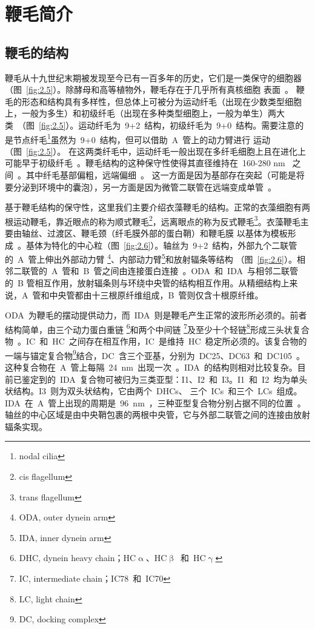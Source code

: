 \section{鞭毛简介}
\subsection{鞭毛的结构}
鞭毛从十九世纪末期被发现至今已有一百多年的历史，它们是一类保守的细胞器（图\ \ref{fig:2.5}）。除酵母和高等植物外，鞭毛存在于几乎所有真核细胞
表面\ \citep{Czarnecki2012,Wheatley1996,Brooks2014,Fliegauf2007}。 鞭毛的形态和结构具有多样性，但总体上可被分为运动纤毛（出现在少数类型细胞上，一般为多生）和初级纤毛（出现在多种类型细胞上，一般为单生）两大类\ \citep{Gluenz2010,Gibbons1960}（图\ \ref{fig:2.5}）。运动纤毛为\ 9+2\ 结构，初级纤毛为\ 9+0\ 结构。需要注意的是节点纤毛\footnote{nodal cilia}虽然为\ 9+0\ 结构，但可以借助\ A\ 管上的动力臂进行
运动\ \citep{Czarnecki2012} （图\ \ref{fig:2.5}）。 在这两类纤毛中，运动纤毛一般出现在多纤毛细胞上且在进化上可能早于初级纤毛\ \citep{Warner2013}。鞭毛结构的这种保守性使得其直径维持在\ 160-280 nm \ 之间\
\citep{Huang2016}。其中纤毛基部偏粗，远端偏细\ \citep{Huang2016}。 这一方面是因为基部存在突起（可能是将要分泌到环境中的囊泡），另一方面是因为微管二联管在远端变成单管\
\citep{Huang2016,Wang2014,Wood2013}。

基于鞭毛结构的保守性，这里我们主要介绍衣藻鞭毛的结构。正常的衣藻细胞有两根运动鞭毛，靠近眼点的称为顺式鞭毛\footnote{cis flagellum}，远离眼点的称为反式鞭毛\footnote{trans flagellum}。衣藻鞭毛主要由轴丝、过渡区、鞭毛颈（纤毛膜外部的蛋白鞘）和鞭毛膜
以基体为模板形成\ \citep{Hilbert2016,Kitagawa2011}。基体为特化的中心粒（图\ \ref{fig:2.6}）。轴丝为\ 9+2\ 结构，外部九个二联管的\ A\ 管上伸出外部动力臂
\footnote{ODA, outer dynein arm}、内部动力臂\footnote{IDA, inner dynein arm}和放射辐条等结构
（图\ \ref{fig:2.6}）。相邻二联管的\ A\ 管和\ B\ 管之间由连接蛋白连接\ \citep{Song2015}。ODA\ 和\ IDA\ 与相邻二联管的\ B
管相互作用，放射辐条则与环绕中央管的结构相互作用。从精细结构上来说，A\ 管和中央管都由十三根原纤维组成，B\ 管则仅含十根原纤维。

ODA\ 为鞭毛的摆动提供动力，而\ IDA\ 则是鞭毛产生正常的波形所必须的。前者结构简单，由三个动力蛋白重链
\footnote{DHC, dynein heavy chain；HC$\upalpha$、HC$\upbeta$\ 和\ HC$\upgamma$}和两个中间链
\footnote{IC, intermediate chain；IC78\ 和\ IC70}及至少十个轻链\footnote{LC, light chain}形成三头状复合物\ \citep{Fowkes1998}。IC\ 和\ HC\ 之间存在相互作用，IC\ 是维持\ HC\ 稳定所必须的。该复合物的一端与锚定复合物\footnote{DC, docking complex}结合，DC\ 含三个亚基，分别为\ DC25、DC63\ 和\ DC105\ \citep{Fowkes1998}。这种复合物在\ A\ 管上每隔\ \SI{24}{\nm}\ 出现一次\ \citep{Fowkes1998}。IDA\ 的结构则相对比较复杂。目前已鉴定到的\ IDA\ 复合物可被归为三类亚型：I1、I2\ 和\ I3。I1\ 和\ I2\ 均为单头状结构。I3\ 则为双头状结构，它由两个\ DHCs、 三个\ ICs\ 和三个\ LCs\ 组成。IDA\ 在\ A\ 管上出现的周期是\ \SI{96}{\nm}\ \citep{Oda2014}，三种亚型复合物分别占据不同的位置\
\citep{Perrone1998}。 轴丝的中心区域是由中央鞘包裹的两根中央管，它与外部二联管之间的连接由放射辐条实现。


